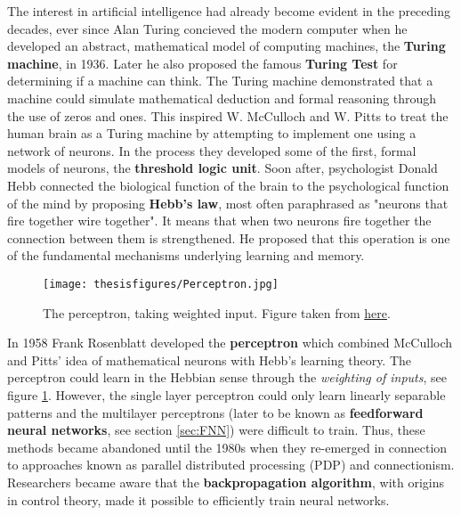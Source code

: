 \documentclass[twoside,english]{uiofysmaster}
\begin{document}
The interest in artificial intelligence had already become evident in the preceding decades, ever since Alan Turing concieved the modern computer when he developed an abstract, mathematical model of computing machines, the \textbf{Turing machine}, in 1936. Later he also proposed the famous \textbf{Turing Test} for determining if a machine can think. The Turing machine demonstrated that a machine could simulate mathematical deduction and formal reasoning through the use of zeros and ones. This inspired W. McCulloch and W. Pitts to treat the human brain as a Turing machine by attempting to implement one using a network of neurons. In the process they developed some of the first, formal models of neurons, the \textbf{threshold logic unit}. Soon after, psychologist Donald Hebb connected the biological function of the brain to the psychological function of the mind by proposing \textbf{Hebb's law}, most often paraphrased as "neurons that fire together wire together". It means that when two neurons fire together the connection between them is strengthened. He proposed that this operation is one of the fundamental mechanisms underlying learning and memory.


\begin{figure}
\centering
 \texttt{[image: thesisfigures/Perceptron.jpg]}
 \caption{The perceptron, taking weighted input. Figure taken from \href{http://kindsonthegenius.blogspot.com/2018/01/what-is-perceptron-how-perceptron-works.html}{here}.}
 \label{fig:Perceptron}
\end{figure}

In 1958 Frank Rosenblatt developed the \textbf{perceptron} which combined McCulloch and Pitts' idea of mathematical neurons with Hebb's learning theory. The perceptron could learn in the Hebbian sense through the \textit{weighting of inputs}, see figure \ref{fig:Perceptron}. However, the single layer perceptron could only learn linearly separable patterns and the multilayer perceptrons (later to be known as \textbf{feedforward neural networks}, see section \ref{sec:FNN}) were difficult to train. Thus, these methods became abandoned until the 1980s when they re-emerged in connection to approaches known as parallel distributed processing (PDP) and connectionism. Researchers became aware that the \textbf{backpropagation algorithm}, with origins in control theory, made it possible to efficiently train neural networks. 
\end{document}
